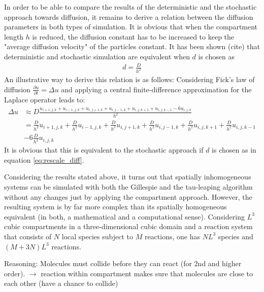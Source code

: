 In order to be able to compare the results of the deterministic and the stochastic approach towards diffusion, it remains to derive a relation between the diffusion parameters in both types of simulation. It is obvious that when the compartment length $h$ is reduced, the diffusion constant has to be increased to keep the "average diffusion velocity" of the particles constant. It has been shown (cite) that deterministic and stochastic simulation are equivalent when $d$ is chosen as
\begin{align}
\label{eq:rescale_diff}
d = \frac{D}{h^2}
\end{align}
An illustrative way to derive this relation is as follows: Considering Fick's law of diffusion $\frac{\partial u}{\partial t} = \Delta u$ and applying a central finite-difference approximation for the Laplace operator leads to:
\begin{equation}
\begin{split}
\Delta u &\approx D\frac{u_{i+1,j,k} + u_{i-1,j,k} + u_{i,j+1,k} + u_{i,j-1,k} + u_{i,j,k+1} + u_{i,j,k-1} - 6u_{i,j,k}}{h^2} \\
&= \frac{D}{h^2}u_{i+1,j,k} + \frac{D}{h^2}u_{i-1,j,k} + \frac{D}{h^2}u_{i,j+1,k} + \frac{D}{h^2}u_{i,j-1,k} + \frac{D}{h^2}u_{i,j,k+1} + \frac{D}{h^2}u_{i,j,k-1} \\
&- 6\frac{D}{h^2}u_{i,j,k}
\end{split}
\end{equation}
It is obvious that this is equivalent to the stochastic approach if $d$ is chosen as in equation \eqref{eq:rescale_diff}. 

Considering the results stated above, it turns out that spatially inhomogeneous systems can be simulated with both the Gillespie and the tau-leaping algorithm without any changes just by applying the compartment approach. However, the resulting system is by far more complex than its spatially homogeneous equivalent (in both, a mathematical and a computational sense). Considering $L^3$ cubic compartments in a three-dimensional cubic domain and a reaction system that consists of $N$ local species subject to $M$ reactions, one has $N L^3$ species and $(M+3N) L^3$ reactions. 

\ifdebug
Reasoning: Molecules must collide before they can react (for 2nd and higher order). $\rightarrow$ reaction within compartment makes sure that molecules are close to each other (have a chance to collide)
\fi